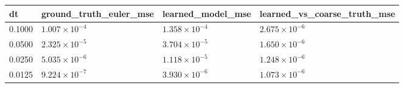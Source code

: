 \begin{tabular}{llll}
\toprule
dt & ground\_truth\_euler\_mse & learned\_model\_mse & learned\_vs\_coarse\_truth\_mse \\
\midrule
0.1000 & \(1.007\times10^{-4}\) & \(1.358\times10^{-4}\) & \(2.675\times10^{-6}\) \\
0.0500 & \(2.325\times10^{-5}\) & \(3.704\times10^{-5}\) & \(1.650\times10^{-6}\) \\
0.0250 & \(5.035\times10^{-6}\) & \(1.118\times10^{-5}\) & \(1.248\times10^{-6}\) \\
0.0125 & \(9.224\times10^{-7}\) & \(3.930\times10^{-6}\) & \(1.073\times10^{-6}\) \\
\bottomrule
\end{tabular}
